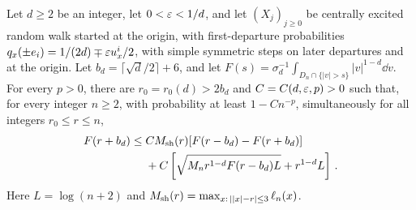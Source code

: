\begin{lemma}\label{lem:radial}
Let $d\geq2$ be an integer, let $0<\varepsilon<1/d$, and let $(X_j)_{j\geq0}$ be centrally
excited random walk started at the origin, with first-departure probabilities
$q_x(\pm e_i)=1/(2d)\mp\varepsilon u_x^i/2$, with simple symmetric
steps on later departures and at the origin.
Let $b_d=\lceil\sqrt d/2\rceil+6$, and let
$F(s)=\sigma_d^{-1}\int_{D_n\cap\{|v|>s\}}|v|^{1-d}\dd v$.
For every $p>0$, there are $r_0=r_0(d)>2b_d$ and $C=C(d,\varepsilon,p)>0$
such that, for every integer $n\geq2$, with probability at least
$1-Cn^{-p}$, simultaneously for
all integers $r_0\leq r\leq n$,
\begin{equation}\label{eq:radial}
\begin{split}
F(r+b_d)\leq{}&CM_{\rm sh}(r)
 [F(r-b_d)-F(r+b_d)]\\
&+C\left[\sqrt{M_nr^{1-d}F(r-b_d)L}+r^{1-d}L\right]\, .
\end{split}
\end{equation}
Here $L=\log(n+2)$ and
$M_{\rm sh}(r)=\max_{x:\,||x|-r|\leq3}\ell_n(x)$.
\end{lemma}

